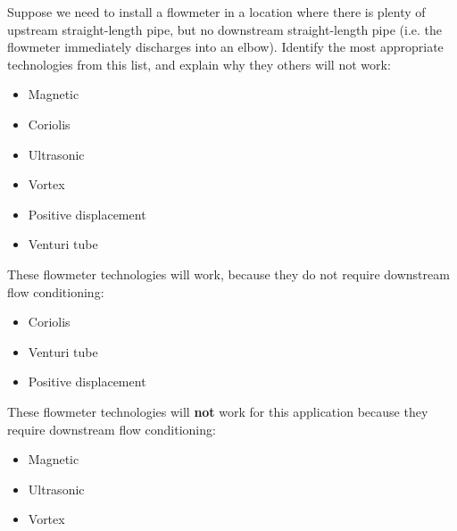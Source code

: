 
Suppose we need to install a flowmeter in a location where there is plenty of upstream straight-length pipe, but no downstream straight-length pipe (i.e. the flowmeter immediately discharges into an elbow).  Identify the most appropriate technologies from this list, and explain why they others will not work:

\begin{itemize}
\item{} Magnetic
\item{} Coriolis
\item{} Ultrasonic
\item{} Vortex
\item{} Positive displacement
\item{} Venturi tube
\end{itemize}














\noindent
These flowmeter technologies will work, because they do not require downstream flow conditioning:

\begin{itemize}
\item{} Coriolis
\item{} Venturi tube
\item{} Positive displacement
\end{itemize}

\vskip 10pt

\noindent
These flowmeter technologies will {\bf not} work for this application because they require downstream flow conditioning:

\begin{itemize}
\item{} Magnetic
\item{} Ultrasonic
\item{} Vortex
\end{itemize}





